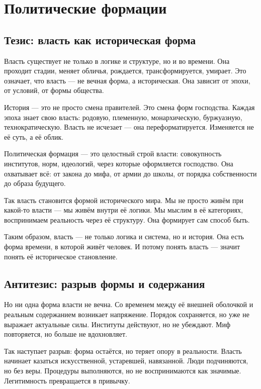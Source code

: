 \chapter{Политические формации}

\section{Тезис: власть как историческая форма}

Власть существует не только в логике и структуре, но и во времени. Она проходит стадии, меняет обличья, рождается, трансформируется, умирает. Это означает, что власть — не вечная форма, а историческая. Она зависит от эпохи, от условий, от формы общества.

История — это не просто смена правителей. Это смена форм господства. Каждая эпоха знает свою власть: родовую, племенную, монархическую, буржуазную, технократическую. Власть не исчезает — она переформатируется. Изменяется не её суть, а её облик.

Политическая формация — это целостный строй власти: совокупность институтов, норм, идеологий, через которые оформляется господство. Она охватывает всё: от закона до мифа, от армии до школы, от порядка собственности до образа будущего.

Так власть становится формой исторического мира. Мы не просто живём при какой-то власти — мы живём внутри её логики. Мы мыслим в её категориях, воспринимаем реальность через её структуру. Она формирует сам способ быть.

Таким образом, власть — не только логика и система, но и история. Она есть форма времени, в которой живёт человек. И потому понять власть — значит понять её историческое становление.

\section{Антитезис: разрыв формы и содержания}

Но ни одна форма власти не вечна. Со временем между её внешней оболочкой и реальным содержанием возникает напряжение. Порядок сохраняется, но уже не выражает актуальные силы. Институты действуют, но не убеждают. Миф повторяется, но больше не вдохновляет.

Так наступает разрыв: форма остаётся, но теряет опору в реальности. Власть начинает казаться искусственной, устаревшей, навязанной. Люди подчиняются, но без веры. Процедуры выполняются, но не воспринимаются как значимые. Легитимность превращается в привычку.

